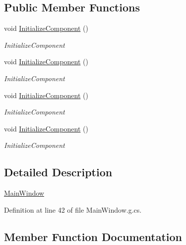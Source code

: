 \subsection*{Public Member Functions}
\begin{DoxyCompactItemize}
\item 
void \hyperlink{class_l_i_d_a_r___w_p_f___t_e_s_t_1_1_main_window_ab6fabbf40bebce362c6b4f8ee8891ac5}{Initialize\+Component} ()
\begin{DoxyCompactList}\small\item\em Initialize\+Component \end{DoxyCompactList}\item 
void \hyperlink{class_l_i_d_a_r___w_p_f___t_e_s_t_1_1_main_window_ab6fabbf40bebce362c6b4f8ee8891ac5}{Initialize\+Component} ()
\begin{DoxyCompactList}\small\item\em Initialize\+Component \end{DoxyCompactList}\item 
void \hyperlink{class_l_i_d_a_r___w_p_f___t_e_s_t_1_1_main_window_ab6fabbf40bebce362c6b4f8ee8891ac5}{Initialize\+Component} ()
\begin{DoxyCompactList}\small\item\em Initialize\+Component \end{DoxyCompactList}\item 
void \hyperlink{class_l_i_d_a_r___w_p_f___t_e_s_t_1_1_main_window_ab6fabbf40bebce362c6b4f8ee8891ac5}{Initialize\+Component} ()
\begin{DoxyCompactList}\small\item\em Initialize\+Component \end{DoxyCompactList}\end{DoxyCompactItemize}


\subsection{Detailed Description}
\hyperlink{class_l_i_d_a_r___w_p_f___t_e_s_t_1_1_main_window}{Main\+Window} 



Definition at line 42 of file Main\+Window.\+g.\+cs.



\subsection{Member Function Documentation}
